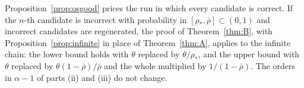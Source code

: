 \begin{remark}
Proposition~\ref{prop:osgood} prices the run in which every candidate is correct. If the $n$-th candidate is incorrect with probability in $[\rho_{\ast},\bar\rho]\subset(0,1)$ and incorrect candidates are regenerated, the proof of Theorem~\ref{thm:B}, with Proposition~\ref{prop:infinite} in place of Theorem~\ref{thm:A}, applies to the infinite chain: the lower bound holds with $\theta$ replaced by $\theta/\rho_{\ast}$, and the upper bound with $\theta$ replaced by $\theta(1-\bar\rho)/\bar\rho$ and the whole multiplied by $1/(1-\bar\rho)$. The orders in $\alpha-1$ of parts (ii) and (iii) do not change.
\end{remark}
